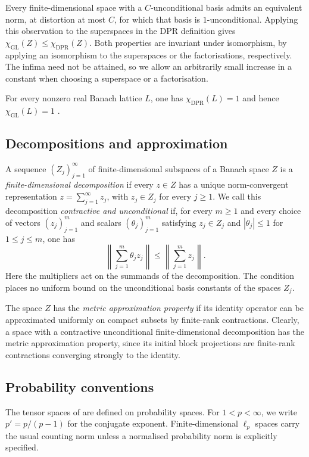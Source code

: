 \documentclass[11pt,a4paper,reqno]{amsart}
\theoremstyle{definition}
\numberwithin{equation}{section}
\begin{document}
Every finite-dimensional space with a $C$-unconditional basis admits an equivalent norm, at distortion at most $C$, for which that basis is $1$-unconditional. Applying this observation to the superspaces in the DPR definition gives $\chi_{\mathrm{GL}}(Z)\leq\chi_{\mathrm{DPR}}(Z)$. Both properties are invariant under isomorphism, by applying an isomorphism to the superspaces or the factorisations, respectively. The infima need not be attained, so we allow an arbitrarily small increase in a constant when choosing a superspace or a factorisation.

For every nonzero real Banach lattice $L$, one has $\chi_{\mathrm{DPR}}(L)=1$ and hence $\chi_{\mathrm{GL}}(L)=1$ \cite[p.~397]{FigielJohnsonTzafriri1975}.

\subsection{Decompositions and approximation}
\label{subsec:decompositions} A sequence $(Z_j)_{j=1}^{\infty}$ of finite-dimensional subspaces of a Banach space $Z$ is a \emph{finite-dimensional decomposition} if every $z\in Z$ has a unique norm-convergent representation $z=\sum_{j=1}^{\infty}z_j$, with $z_j\in Z_j$ for every $j\geq1$. We call this decomposition \emph{contractive and unconditional} if, for every $m\geq1$ and every choice of vectors $(z_j)_{j=1}^m$ and scalars $(\theta_j)_{j=1}^m$ satisfying $z_j\in Z_j$ and $|\theta_j|\leq1$ for $1\leq j\leq m$, one has
\begin{equation*}
 \left\|\sum_{j=1}^{m}\theta_jz_j\right\|
   \leq\left\|\sum_{j=1}^{m}z_j\right\|.
\end{equation*}
Here the multipliers act on the summands of the decomposition. The condition places no uniform bound on the unconditional basis constants of the spaces $Z_j$.

The space $Z$ has the \emph{metric approximation property} if its identity operator can be approximated uniformly on compact subsets by finite-rank contractions. Clearly, a space with a contractive unconditional finite-dimensional decomposition has the metric approximation property, since its initial block projections are finite-rank contractions converging strongly to the identity.

\subsection{Probability conventions}\label{subsec:probability}
The tensor spaces of  are defined on probability spaces. For $1<p<\infty$, we write $p'=p/(p-1)$ for the conjugate exponent. Finite-dimensional $\ell_p$ spaces carry the usual counting norm unless a normalised probability norm is explicitly specified.
\end{document}
